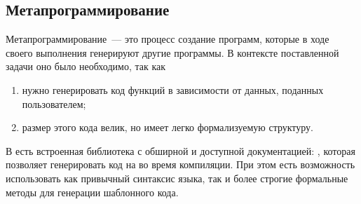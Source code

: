 \subsection{Метапрограммирование}
Метапрограммирование~--- это процесс создание программ, которые в ходе своего выполнения генерируют другие программы.
В контексте поставленной задачи оно было необходимо, так как
\begin{enumerate}[label=(\alph*)]
    \item нужно генерировать код функций в зависимости от данных, поданных пользователем;
    \item размер этого кода велик, но имеет легко формализуемую структуру.
\end{enumerate}
В \Haskell{} есть встроенная библиотека с обширной и доступной документацией: \Th{}, которая позволяет генерировать код на \Haskell{} во время компиляции.
При этом есть возможность использовать как привычный синтаксис языка, так и более строгие формальные методы для генерации шаблонного кода.

